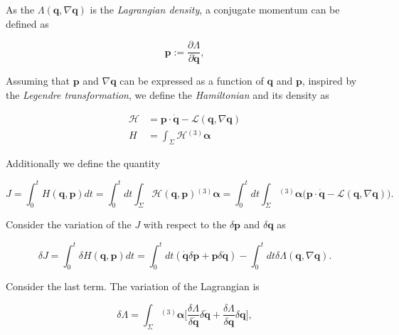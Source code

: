 {    As the $\Lambda(\boldsymbol{q}, \nabla\boldsymbol{q})$ is the \textit{Lagrangian density}, a conjugate momentum can be defined as 
    
    \begin{equation}
    \boldsymbol{p} := \frac{\partial\Lambda}{\partial\dot{\boldsymbol{q}}},
    \end{equation}
    
    Assuming that $\boldsymbol{p}$ and $\nabla\boldsymbol{q}$ can be expressed as a function of $\boldsymbol{q}$ and $\boldsymbol{p}$, inspired by the \textit{Legendre transformation}, we define the \textit{Hamiltonian} and its density as
    
    \begin{align}
    \mathcal{H} &= \boldsymbol{p}\cdot\dot{\boldsymbol{q}} - \mathcal{L}(\boldsymbol{q}, \nabla\boldsymbol{q}) \\
    H &= \int_{\Sigma}\mathcal{H}{^{(3)}\boldsymbol{\alpha}}
    \end{align}
    
    Additionally we define the quantity 
    
    \begin{equation}
    J = \int_{0}^{t}H(\boldsymbol{q},\boldsymbol{p})dt = \int_{0}^{t}dt\int_{\Sigma}\mathcal{H}(\boldsymbol{q},\boldsymbol{p}){^{(3)}\boldsymbol{\alpha}} = \int_{0}^{t}dt\int_{\Sigma}{^{(3)}\boldsymbol{\alpha}}\Big(\boldsymbol{p}\cdot\dot{\boldsymbol{q}} - \mathcal{L}(\boldsymbol{q},\nabla\boldsymbol{q})\Big).
    \end{equation}
    
    Consider the variation of the $J$ with respect to the $\delta\boldsymbol{p}$ and $\delta\boldsymbol{q}$ as
    
    \begin{equation}
    \delta J = \int_{0}^{t}\delta H(\boldsymbol{q},\boldsymbol{p})dt = \int_{0}^{t}dt (\dot{\boldsymbol{q}}\delta\boldsymbol{p}+\boldsymbol{p}\delta\dot{\boldsymbol{q}}) - \int_{0}^{t}dt\delta\Lambda(\boldsymbol{q}, \nabla\boldsymbol{q}).
    \end{equation}
    
    Consider the last term. The variation of the Lagrangian is
    
    \begin{equation}
    \delta\Lambda = \int_{\Sigma}{^{(3)}\boldsymbol{\alpha}}\Bigg[\frac{\delta\Lambda}{\delta\dot{\boldsymbol{q}}}\delta\dot{\boldsymbol{q}}+\frac{\delta\Lambda}{\delta\boldsymbol{q}}\delta\boldsymbol{q}\Bigg],
    \end{equation}
    
}
